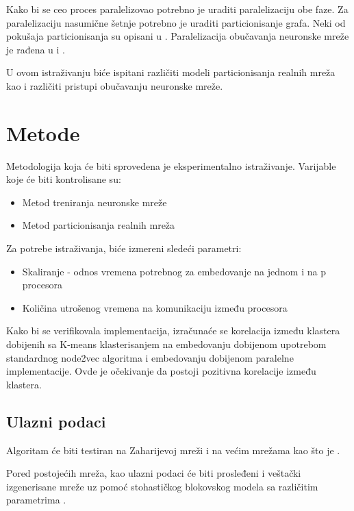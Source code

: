 \documentclass[]{amsart}
\begin{document}
Kako bi se ceo proces paralelizovao potrebno je uraditi paralelizaciju obe faze. Za paralelizaciju nasumične šetnje potrebno je uraditi particionisanje grafa. Neki od pokušaja particionisanja su opisani u \cite{lombardo2019actornode2vec}. Paralelizacija obučavanja neuronske mreže je rađena u \cite{gupta2018distributed} i \cite{anil2018large}. 

U ovom istraživanju biće ispitani različiti modeli particionisanja realnih mreža kao i različiti pristupi obučavanju neuronske mreže. 

\section{Metode}
\label{sec:methods}

Metodologija koja će biti sprovedena je eksperimentalno istraživanje. Varijable koje će biti kontrolisane su:

\begin{itemize}
  \item Metod treniranja neuronske mreže 
  \item Metod particionisanja realnih mreža
\end{itemize}

Za potrebe istraživanja, biće izmereni sledeći parametri:

\begin{itemize}
  \item Skaliranje - odnos vremena potrebnog za embedovanje na jednom i na p procesora
  \item Količina utrošenog vremena na komunikaciju između procesora 
\end{itemize}

Kako bi se verifikovala implementacija, izračunaće se korelacija između klastera dobijenih sa K-means klasterisanjem na embedovanju dobijenom upotrebom standardnog node2vec algoritma i embedovanju dobijenom paralelne implementacije. Ovde je očekivanje da postoji pozitivna korelacije između klastera. 



\subsection{Ulazni podaci}
\label{sec:input_data}

Algoritam će biti testiran na Zaharijevoj mreži \cite{zachary1977information} i na većim mrežama kao što je \cite{leskovec2009community}. 

Pored postojećih mreža, kao ulazni podaci će biti prosleđeni i veštački izgenerisane mreže uz pomoć stohastičkog blokovskog modela sa različitim parametrima \cite{abbe2018community}.




\end{document}
